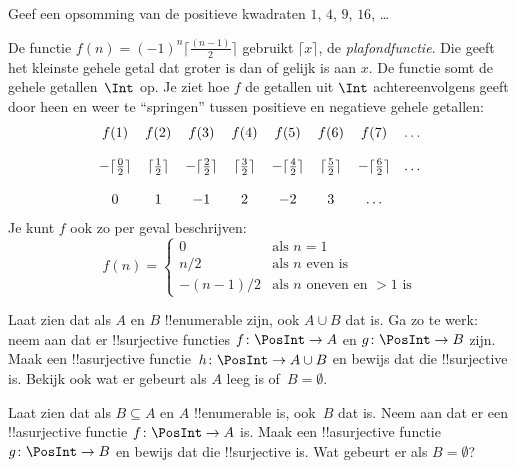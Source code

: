 \documentclass[../../../include/open-logic-section]{subfiles}
\begin{document}
\begin{prob}
Geef een opsomming van de positieve kwadraten $1$, $4$, $9$, $16$, \dots
\end{prob}

\begin{ex}
De functie $f(n) = (-1)^{n} \lceil \frac{(n-1)}{2}\rceil$ gebruikt
$\lceil x \rceil$, de \emph{plafondfunctie}. Die geeft het kleinste
gehele getal dat groter is dan of gelijk is aan $x$. De functie somt
de gehele getallen~$\Int$ op. Je ziet hoe $f$ de getallen uit $\Int$
achtereenvolgens geeft door heen en weer te ``springen'' tussen positieve en negatieve
gehele getallen:
\[
\begin{array}{c c c c c c c c}
f(1) & f(2) & f(3) & f(4) & f(5) & f(6) & f(7) & \dots \\ \\
- \lceil \tfrac{0}{2} \rceil & \lceil \tfrac{1}{2}\rceil & - \lceil \tfrac{2}{2} \rceil & \lceil \tfrac{3}{2} \rceil & - \lceil \tfrac{4}{2} \rceil  & \lceil \tfrac{5}{2}
\rceil & - \lceil \tfrac{6}{2} \rceil & \dots \\ \\
0 & 1 & -1 & 2 & -2 & 3 & \dots
\end{array}
\]
Je kunt $f$ ook zo per geval beschrijven:
\[
f(n) = \begin{cases}
  0 & \text{als $n = 1$}\\
  n/2 & \text{als $n$ even is}\\
  -(n-1)/2 & \text{als $n$ oneven en $>1$ is}
  \end{cases}
\]
\end{ex}

\begin{prob}
  Laat zien dat als $A$ en $B$ !!{enumerable} zijn, ook $A \cup B$ dat
  is. Ga zo te werk: neem aan dat er !!{surjective} functies
  $f\colon \PosInt \to A$ en $g\colon \PosInt \to B$ zijn. Maak een
  !!a{surjective} functie~$h\colon \PosInt \to A \cup B$ en bewijs dat
  die !!{surjective} is. Bekijk ook wat er gebeurt als $A$ leeg is
  of~$B = \emptyset$.
\end{prob}
  
\begin{prob}
  Laat zien dat als $B \subseteq A$ en $A$ !!{enumerable} is, ook~$B$
  dat is. Neem aan dat er een !!a{surjective} functie
  $f\colon \PosInt \to A$ is. Maak een !!a{surjective} functie
  $g\colon \PosInt \to B$ en bewijs dat die !!{surjective} is. Wat
  gebeurt er als $B = \emptyset$?
\end{prob}
    
\end{document}
